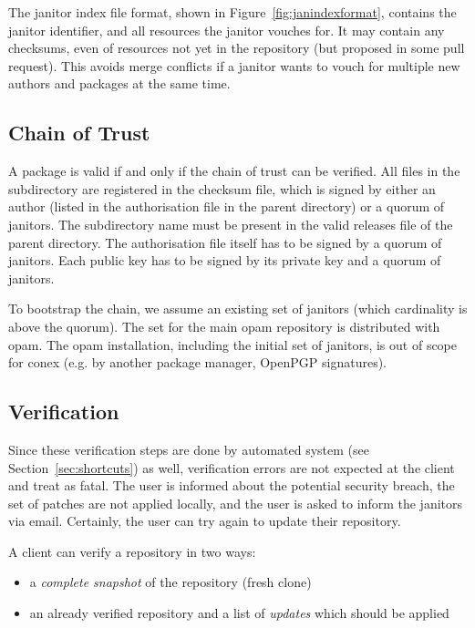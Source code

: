 \documentclass[nocopyrightspace]{sigplanconf}
\newcommand{\TODO}[1]{\textbf{[TODO: #1]}}
\begin{document}
The janitor index file format, shown in Figure~\ref{fig:janindexformat}, contains the janitor identifier, and all resources the janitor vouches for.
It may contain any checksums, even of resources not yet in the repository (but proposed in some pull request).
This avoids merge conflicts if a janitor wants to vouch for multiple new authors and packages at the same time.

\subsection{Chain of Trust}
A package is valid if and only if the chain of trust can be verified.
All files in the subdirectory are registered in the checksum file, which is signed by either an author (listed in the authorisation file in the parent directory) or a quorum of janitors.
The subdirectory name must be present in the valid releases file of the parent directory.
The authorisation file itself has to be signed by a quorum of janitors.
Each public key has to be signed by its private key and a quorum of janitors.

To bootstrap the chain, we assume an existing set of janitors (which cardinality is above the quorum).
The set for the main opam repository is distributed with opam.
The opam installation, including the initial set of janitors, is out of scope for conex (e.g. by another package manager, OpenPGP signatures).

\subsection{Verification}
Since these verification steps are done by automated system (see Section~\ref{sec:shortcuts}) as well, verification errors are not expected at the client and treat as fatal.
The user is informed about the potential security breach, the set of patches are not applied locally, and the user is asked to inform the janitors via email.
Certainly, the user can try again to update their repository.

A client can verify a repository in two ways:
\begin{itemize}
  \item a \emph{complete snapshot} of the repository (fresh clone)
  \item an already verified repository and a list of \emph{updates} which should be applied
\end{itemize}
\end{document}

